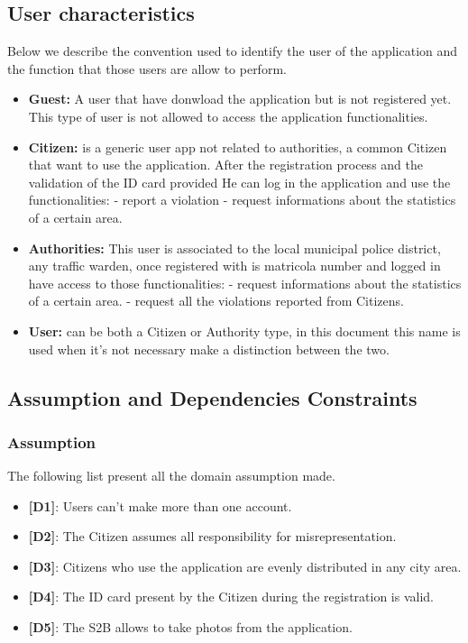 \documentclass{article}
\begin{document}
\subsection{User characteristics}
Below we describe the convention used to identify the user of the application and the function that those 
users are allow to perform.
\begin{itemize}
    \item \textbf{Guest:} A user that have donwload the application but is not 
    registered yet. This type of user is not allowed to access 
    the application functionalities.
    \item \textbf{Citizen:} is a generic user app not related to authorities, a 
    common Citizen that want to use the application. After the
    registration process and the validation of the ID card provided
    He can log in the application and use the functionalities:
    - report a violation
    - request informations about the statistics of a certain area.
    \item \textbf{Authorities:} This user is associated to the local municipal
    police district, any traffic warden, once registered with 
    is matricola number and logged in have access to those 
    functionalities:
    - request informations about the statistics of a certain area.
    - request all the violations reported from Citizens. 
    \item \textbf{User:} can be both a Citizen or Authority type, in this document
    this name is used when it's not necessary make a distinction 
    between the two.
\end{itemize}

\subsection{Assumption and Dependencies Constraints}
\subsubsection{Assumption}
The following list present all the domain assumption made.
\begin{itemize}
    \item \textbf{[D1]}: Users can't make more than one account.
    \item \textbf{[D2]}: The Citizen assumes all responsibility for misrepresentation.
    \item \textbf{[D3]}: Citizens who use the application are evenly distributed in any city area.
    \item \textbf{[D4]}: The ID card present by the Citizen during the registration is valid.
    \item \textbf{[D5]}: The S2B allows to take photos from the application.
\end{itemize}
\end{document}
